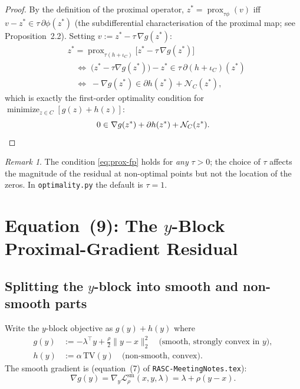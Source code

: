\documentclass[11pt]{article}
\newcommand{\prox}{\operatorname{prox}}
\newcommand{\TV}{\mathrm{TV}}
\newcommand{\mini}{\mathop{\mathrm{minimize}}}
\theoremstyle{plain}
\theoremstyle{remark}
\newtheorem{remark}{Remark}
\begin{document}
\begin{proof}
  By the definition of the proximal operator, $z^* = \prox_{\tau\phi}(v)$ iff
  $v - z^* \in \tau\,\partial\phi(z^*)$ (the subdifferential characterisation
  of the proximal map; see \cite{ParBoy14} Proposition~2.2).  Setting
  $v := z^* - \tau\,\nabla g(z^*)$:
  \begin{align*}
    &z^* = \prox_{\tau(h+\iota_C)}\!\bigl[z^* - \tau\,\nabla g(z^*)\bigr]\\
    &\quad\iff\;
    \bigl(z^* - \tau\nabla g(z^*)\bigr) - z^* \in \tau\,\partial(h + \iota_C)(z^*)\\
    &\quad\iff\;
    -\nabla g(z^*) \in \partial h(z^*) + \mathcal{N}_C(z^*),
  \end{align*}
  which is exactly the first-order optimality condition for
  $\mini_{z\in C}[g(z) + h(z)]$:
  \[
    0 \in \nabla g(z^*) + \partial h(z^*) + \mathcal{N}_C(z^*). \qedhere
  \]
\end{proof}

\begin{remark}
  The condition \eqref{eq:prox-fp} holds for \emph{any} $\tau > 0$; the
  choice of $\tau$ affects the magnitude of the residual at non-optimal points
  but not the location of the zeros.  In \texttt{optimality.py} the default
  is $\tau = 1$.
\end{remark}

\section{Equation~(9): The $y$-Block Proximal-Gradient Residual}
\label{sec:eq9}

\subsection{Splitting the $y$-block into smooth and non-smooth parts}

Write the $y$-block objective as $g(y) + h(y)$ where
\begin{align*}
  g(y) &:= -\lambda^\top y + \tfrac{\rho}{2}\|y - x\|_2^2
           \quad\text{(smooth, strongly convex in $y$)},\\
  h(y) &:= \alpha\,\TV(y)
           \quad\text{(non-smooth, convex)}.
\end{align*}
The smooth gradient is (equation~(7) of \texttt{RASC-MeetingNotes.tex}):
\begin{equation}\label{eq:smooth-grad}
  \nabla g(y) = \nabla_y \mathcal{L}^{\mathrm{sm}}_\rho(x,y,\lambda)
  = \lambda + \rho(y - x).
\end{equation}
\end{document}
